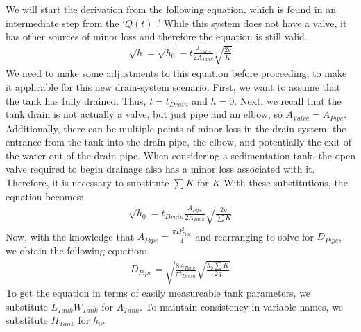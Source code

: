 \documentclass[letterpaper,10pt,english]{sphinxmanual}
\begin{document}
We will start the derivation from the following equation, which is found in an intermediate step from the ‘\(Q(t)\) {\hyperref[\detokenize{Flow_Control_and_Measurement/FCM_Derivations:heading-flow-for-a-tank-with-a-valve}]{}}.’ While this system does not have a valve, it has other sources of minor loss and therefore the equation is still valid.
\begin{equation}\label{equation:Flow_Control_and_Measurement/FCM_Derivations:Flow_Control_and_Measurement/FCM_Derivations:15}
\begin{split}\sqrt h  = \sqrt{h_0} - t \frac{A_{Valve}}{2 A_{Tank}} \sqrt {\frac{2g}{K}}\end{split}
\end{equation}
We need to make some adjustments to this equation before proceeding, to make it applicable for this new drain-system scenario. First, we want to assume that the tank has fully drained. Thus, \(t = t_{Drain}\) and \(h = 0\). Next, we recall that the tank drain is not actually a valve, but just pipe and an elbow, so \(A_{Valve} = A_{Pipe}\). Additionally, there can be multiple points of minor loss in the drain system: the entrance from the tank into the drain pipe, the elbow, and potentially the exit of the water out of the drain pipe. When considering a sedimentation tank, the open valve required to begin drainage also has a minor loss associated with it. Therefore, it is necessary to substitute \(\sum K\) for \(K\) With these substitutions, the equation becomes:
\begin{equation}\label{equation:Flow_Control_and_Measurement/FCM_Derivations:Flow_Control_and_Measurement/FCM_Derivations:16}
\begin{split}\sqrt{h_0}  = t_{Drain} \frac{A_{Pipe}}{2 A_{Tank}} \sqrt {\frac{2g}{\sum K}}\end{split}
\end{equation}
Now, with the knowledge that \(A_{Pipe} = \frac{\pi D_{Pipe}^2}{4}\) and rearranging to solve for \(D_{Pipe}\), we obtain the following equation:
\begin{equation}\label{equation:Flow_Control_and_Measurement/FCM_Derivations:Flow_Control_and_Measurement/FCM_Derivations:17}
\begin{split}D_{Pipe} = \sqrt{ \frac{8 A_{Tank}}{\pi t_{Drain}} \sqrt{ \frac{h_0 \sum K}{2g} } }\end{split}
\end{equation}
To get the equation in terms of easily measureable tank parameters, we substitute \(L_{Tank} W_{Tank}\) for \(A_{Tank}\). To maintain consistency in variable names, we substitute \(H_{Tank}\) for \(h_0\).
\end{document}
